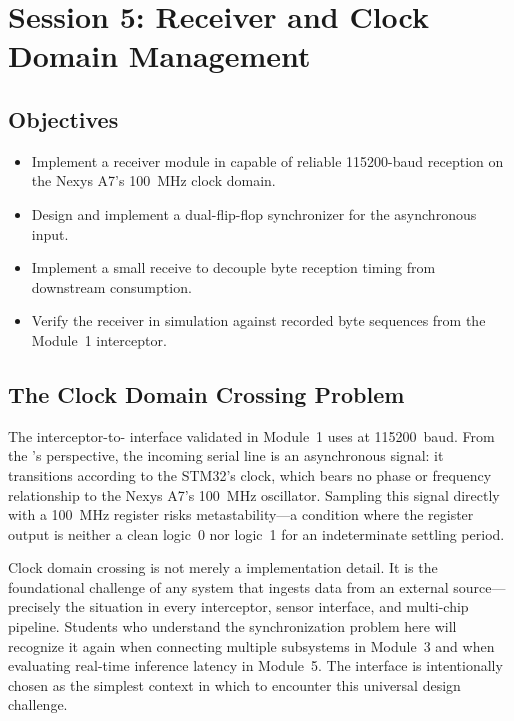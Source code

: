 \documentclass[11pt,letterpaper]{article}
\begin{document}
	\newpage
	\section{Session 5: \UART{} Receiver and Clock Domain Management}
	\label{sec:uart}

	\subsection{Objectives}

	\begin{itemize}[leftmargin=2em]
		\item Implement a \UART{} receiver module in \VHDL{} capable of reliable 115200-baud reception on the Nexys A7's 100~MHz clock domain.
		\item Design and implement a dual-flip-flop synchronizer for the asynchronous \UART{} input.
		\item Implement a small receive \FIFO{} to decouple byte reception timing from downstream consumption.
		\item Verify the \UART{} receiver in simulation against recorded byte sequences from the Module~1 interceptor.
	\end{itemize}

	\subsection{The Clock Domain Crossing Problem}

	The interceptor-to-\FPGA{} interface validated in Module~1 uses \UART{} at 115200~baud. From the \FPGA{}'s perspective, the incoming serial line is an asynchronous signal: it transitions according to the STM32's clock, which bears no phase or frequency relationship to the Nexys A7's 100~MHz oscillator. Sampling this signal directly with a 100~MHz register risks metastability---a condition where the register output is neither a clean logic~0 nor logic~1 for an indeterminate settling period.

	\begin{tcolorbox}[infobox={Why This Matters Beyond \UART{}}]
		Clock domain crossing is not merely a \UART{} implementation detail. It is the foundational challenge of any system that ingests data from an external source---precisely the situation in every \RF{} interceptor, sensor interface, and multi-chip pipeline. Students who understand the synchronization problem here will recognize it again when connecting multiple \FPGA{} subsystems in Module~3 and when evaluating real-time inference latency in Module~5. The \UART{} interface is intentionally chosen as the simplest context in which to encounter this universal \FPGA{} design challenge.
	\end{tcolorbox}
\end{document}
